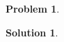 \documentclass[10pt]{article}
\author{}
\title{}
\date{\today}
\theoremstyle{plain}
\theoremstyle{definition}
\newtheorem{prob}{Problem}
\newtheorem*{sol}{Solution}
\theoremstyle{remark}
\begin{document}
\begin{prob}

\end{prob}

\medskip 

\begin{sol}

\end{sol}
\end{document}

